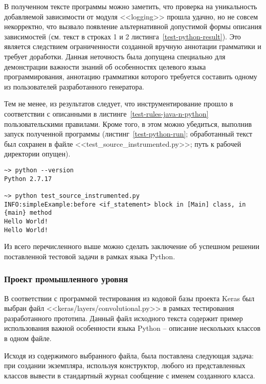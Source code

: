 В полученном тексте программы можно заметить, что проверка на уникальность добавляемой зависимости от модуля <<logging>> прошла удачно, но не совсем некорректно, что вызвало появление альтернативной допустимой формы описания зависимостей (см. текст в строках 1 и 2 листинга~\ref{test-python-result}).
Это является следствием ограниченности созданной вручную аннотации грамматики и требует доработки.
Данная неточность была допущена специально для демонстрации важности знаний об особенностях целевого языка программирования, аннотацию грамматики которого требуется составить одному из пользователей разработанного генератора.

Тем не менее, из результатов следует, что инструментирование прошло в соответствии с описанными в листинге~\ref{test-rules-java-n-python} пользовательскими правилами.
Кроме того, в этом можно убедиться, выполнив запуск полученной программы (листинг~\ref{test-python-run}; обработанный текст был сохранен в файле <<test\_source\_instrumented.py>>; путь к рабочей директории опущен).

\begin{lstlisting}[frame=single, label={test-python-run}, caption={Результаты запуска обработанного тестового приложения.}]
~> python --version
Python 2.7.17

~> python test_source_instrumented.py
INFO:simpleExample:before <if_statement> block in [Main] class, in {main} method
Hello World!
Hello World!
\end{lstlisting}

Из всего перечисленного выше можно сделать заключение об успешном решении поставленной тестовой задачи в рамках языка Python.

\subsubsection{Проект промышленного уровня}

В соответствии с программой тестирования из кодовой базы проекта Keras был выбран файл <<keras/layers/convolutional.py>> в рамках тестирования разработанного прототипа.
Данный файл исходного текста содержит пример использования важной особенности языка Python -- описание нескольких классов в одном файле.

Исходя из содержимого выбранного файла, была поставлена следующая задача:
при создании экземпляра, используя конструктор, любого из представленных классов вывести в стандартный журнал сообщение с именем созданного класса.

